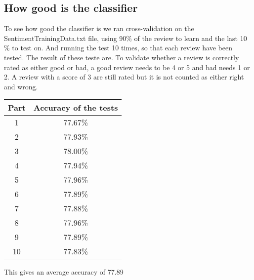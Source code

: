 \subsection{How good is the classifier}
To see how good the classifier is we ran cross-validation on the SentimentTrainingData.txt file, using 90\% of the review to learn and the last 10 \% to test on. And running the test 10 times, so that each review have been tested. The result of these teste are. To validate whether a review is correctly rated as either good or bad, a good review needs to be 4 or 5 and bad needs 1 or 2. A review with a score of 3 are still rated but it is not counted as either right and wrong.

\begin{tabular}{|c|c|}
\hline 
Part & Accuracy of the tests \\ 
\hline 
1 & 77.67\% \\ 
\hline 
2 & 77.93\% \\ 
\hline 
3 & 78.00\% \\ 
\hline 
4 & 77.94\% \\ 
\hline 
5 & 77.96\% \\ 
\hline 
6 & 77.89\% \\ 
\hline 
7 & 77.88\% \\ 
\hline 
8 & 77.96\% \\ 
\hline 
9 & 77.89\% \\ 
\hline 
10 & 77.83\% \\ 
\hline 
\end{tabular} 

This gives an average accuracy of 77.89%